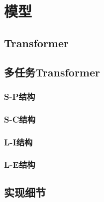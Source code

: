 \chapter{模型}
\label{cha:model}

\section{Transformer}
\label{sec:tf}

\section{多任务Transformer}
\label{sec:mtl_tf}

\subsection{S-P结构}

\subsection{S-C结构}

\subsection{L-I结构}

\subsection{L-E结构}

\section{实现细节}
\label{sec:imp}
